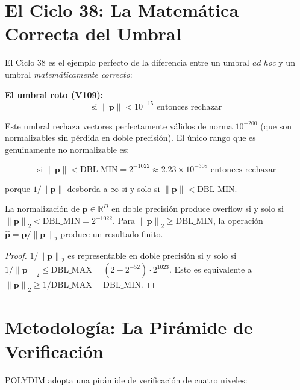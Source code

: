 \section{El Ciclo 38: La Matemática Correcta del Umbral}

El Ciclo 38 es el ejemplo perfecto de la diferencia entre un umbral \textit{ad hoc}
y un umbral \textit{matemáticamente correcto}:

\textbf{El umbral roto (V109):}
\begin{equation}
\text{si } \|{\mathbf{p}\|} < 10^{-15} \text{ entonces rechazar}
\end{equation}

Este umbral rechaza vectores perfectamente válidos de norma $10^{-200}$ (que
son normalizables sin pérdida en doble precisión). El único rango que es
genuinamente no normalizable es:

\begin{equation}
\text{si } \|{\mathbf{p}\|} < \text{DBL\_MIN} = 2^{-1022} \approx 2.23 \times 10^{-308} \text{ entonces rechazar}
\end{equation}

porque $1/\|{\mathbf{p}\|}$ desborda a $\infty$ si y solo si $\|{\mathbf{p}\|} < \text{DBL\_MIN}$.

\begin{theorem}

La normalización de $\mathbf{p} \in \mathbb{R}^D$ en doble precisión produce overflow si y solo si
$\|{\mathbf{p}\|}_2 < \text{DBL\_MIN} = 2^{-1022}$.
Para $\|{\mathbf{p}\|}_2 \ge \text{DBL\_MIN}$, la operación
$\hat{\mathbf{p}} = \mathbf{p}/\|{\mathbf{p}\|}_2$ produce un resultado finito.
\end{theorem}

\begin{proof}
$1/\|{\mathbf{p}\|}_2$ es representable en doble precisión si y solo si
$1/\|{\mathbf{p}\|}_2 \le \text{DBL\_MAX} = (2 - 2^{-52}) \cdot 2^{1023}$.
Esto es equivalente a $\|{\mathbf{p}\|}_2 \ge 1/\text{DBL\_MAX} = \text{DBL\_MIN}$.
\end{proof}

\section{Metodología: La Pirámide de Verificación}

POLYDIM adopta una pirámide de verificación de cuatro niveles:

